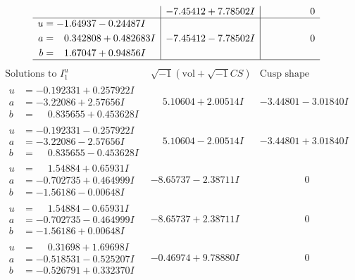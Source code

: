 \documentclass[1p]{elsarticle_modified}
\theoremstyle{definition}
\newcommand{\I}{\sqrt{-1}}
\begin{document}
$$\begin{array}{c|c|c}
 & -7.45412 + 7.78502 I & \phantom{-0.000000 } 0 \\ \hline\begin{aligned}
u &= -1.64937 - 0.24487 I \\
a &= \phantom{-}0.342808 + 0.482683 I \\
b &= \phantom{-}1.67047 + 0.94856 I\end{aligned}
 & -7.45412 - 7.78502 I & \phantom{-0.000000 } 0\\
 \hline 
 \end{array}$$\newpage$$\begin{array}{c|c|c}  
\text{Solutions to }I^u_{1}& \I (\text{vol} + \sqrt{-1}CS) & \text{Cusp shape}\\
 \hline 
\begin{aligned}
u &= -0.192331 + 0.257922 I \\
a &= -3.22086 + 2.57656 I \\
b &= \phantom{-}0.835655 + 0.453628 I\end{aligned}
 & \phantom{-}5.10604 + 2.00514 I & -3.44801 - 3.01840 I \\ \hline\begin{aligned}
u &= -0.192331 - 0.257922 I \\
a &= -3.22086 - 2.57656 I \\
b &= \phantom{-}0.835655 - 0.453628 I\end{aligned}
 & \phantom{-}5.10604 - 2.00514 I & -3.44801 + 3.01840 I \\ \hline\begin{aligned}
u &= \phantom{-}1.54884 + 0.65931 I \\
a &= -0.702735 + 0.464999 I \\
b &= -1.56186 - 0.00648 I\end{aligned}
 & -8.65737 - 2.38711 I & \phantom{-0.000000 } 0 \\ \hline\begin{aligned}
u &= \phantom{-}1.54884 - 0.65931 I \\
a &= -0.702735 - 0.464999 I \\
b &= -1.56186 + 0.00648 I\end{aligned}
 & -8.65737 + 2.38711 I & \phantom{-0.000000 } 0 \\ \hline\begin{aligned}
u &= \phantom{-}0.31698 + 1.69698 I \\
a &= -0.518531 - 0.525207 I \\
b &= -0.526791 + 0.332370 I\end{aligned}
 & -0.46974 + 9.78880 I & \phantom{-0.000000 } 0 \\ \hline\begin{aligned}

\end{aligned}
\end{array}$$
\end{document}

